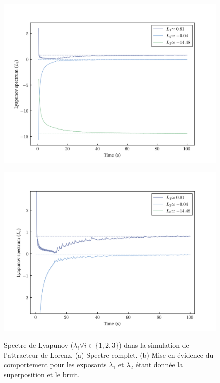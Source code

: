     \begin{figure}[h!]
        \centering
        \begin{minipage}{0.49\textwidth}
          \centering
          \includegraphics[scale = 0.4]{figs/lyapunovs/lyap_lorenz.png}
          \subcaption{}
          \label{fig: lyap_lorenz}
        \end{minipage}
        \begin{minipage}{0.49\textwidth}
          \centering
          \includegraphics[scale = 0.4]{figs/lyapunovs/lyap_lorenz_zoom.png}
          \subcaption{}
          \label{fig: lyap_lorenz_zoom}
        \end{minipage}
        \caption{Spectre de Lyapunov ($\lambda_i\forall i\in\{1, 2, 3\}$) dans la simulation de l'attracteur de Lorenz. (a) Spectre complet. (b) Mise en évidence du comportement pour les exposants $\lambda_1$ et $\lambda_2$ étant donnée la superposition et le bruit.}
        \label{fig : lyaps_lorenz}
    \end{figure}

